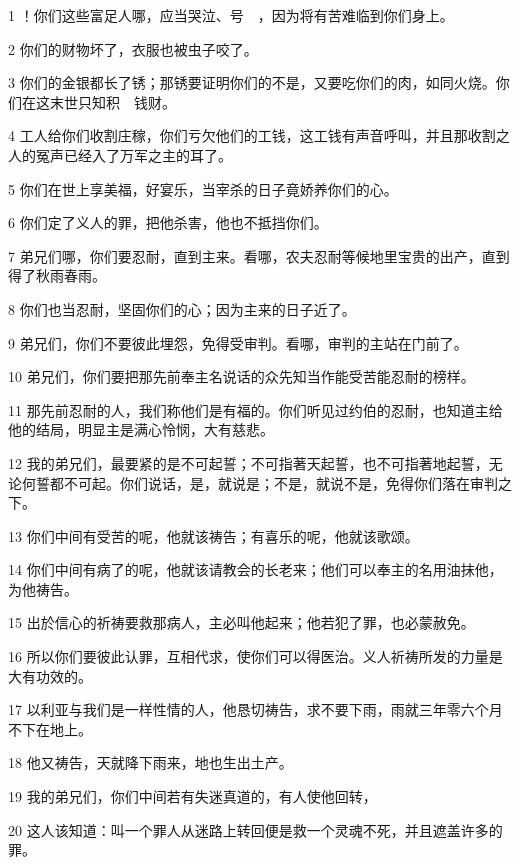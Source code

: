 \par 1 ！你们这些富足人哪，应当哭泣、号　，因为将有苦难临到你们身上。
\par 2 你们的财物坏了，衣服也被虫子咬了。
\par 3 你们的金银都长了锈；那锈要证明你们的不是，又要吃你们的肉，如同火烧。你们在这末世只知积　钱财。
\par 4 工人给你们收割庄稼，你们亏欠他们的工钱，这工钱有声音呼叫，并且那收割之人的冤声已经入了万军之主的耳了。
\par 5 你们在世上享美福，好宴乐，当宰杀的日子竟娇养你们的心。
\par 6 你们定了义人的罪，把他杀害，他也不抵挡你们。
\par 7 弟兄们哪，你们要忍耐，直到主来。看哪，农夫忍耐等候地里宝贵的出产，直到得了秋雨春雨。
\par 8 你们也当忍耐，坚固你们的心；因为主来的日子近了。
\par 9 弟兄们，你们不要彼此埋怨，免得受审判。看哪，审判的主站在门前了。
\par 10 弟兄们，你们要把那先前奉主名说话的众先知当作能受苦能忍耐的榜样。
\par 11 那先前忍耐的人，我们称他们是有福的。你们听见过约伯的忍耐，也知道主给他的结局，明显主是满心怜悯，大有慈悲。
\par 12 我的弟兄们，最要紧的是不可起誓；不可指著天起誓，也不可指著地起誓，无论何誓都不可起。你们说话，是，就说是；不是，就说不是，免得你们落在审判之下。
\par 13 你们中间有受苦的呢，他就该祷告；有喜乐的呢，他就该歌颂。
\par 14 你们中间有病了的呢，他就该请教会的长老来；他们可以奉主的名用油抹他，为他祷告。
\par 15 出於信心的祈祷要救那病人，主必叫他起来；他若犯了罪，也必蒙赦免。
\par 16 所以你们要彼此认罪，互相代求，使你们可以得医治。义人祈祷所发的力量是大有功效的。
\par 17 以利亚与我们是一样性情的人，他恳切祷告，求不要下雨，雨就三年零六个月不下在地上。
\par 18 他又祷告，天就降下雨来，地也生出土产。
\par 19 我的弟兄们，你们中间若有失迷真道的，有人使他回转，
\par 20 这人该知道：叫一个罪人从迷路上转回便是救一个灵魂不死，并且遮盖许多的罪。


